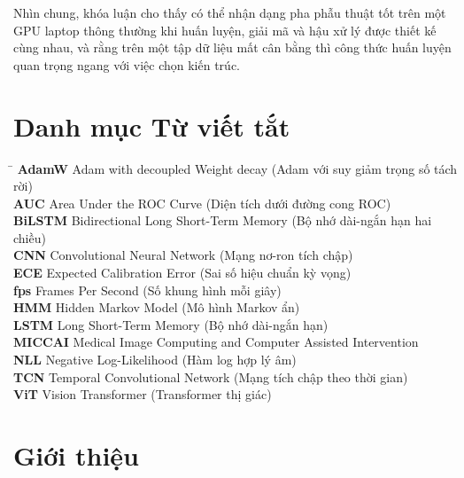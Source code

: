 \documentclass[11pt,a4paper]{report}
\begin{document}
Nhìn chung, khóa luận cho thấy có thể nhận dạng pha phẫu thuật tốt trên một GPU laptop thông thường khi huấn luyện, giải mã và hậu xử lý được thiết kế cùng nhau, và rằng trên một tập dữ liệu mất cân bằng thì công thức huấn luyện quan trọng ngang với việc chọn kiến trúc.

\tableofcontents
\listoffigures
\listoftables

\chapter*{Danh mục Từ viết tắt}

\begin{tabbing}
\hspace*{3cm}\=\kill
\textbf{AdamW} \> Adam with decoupled Weight decay (Adam với suy giảm trọng số tách rời)\\
\textbf{AUC} \> Area Under the ROC Curve (Diện tích dưới đường cong ROC)\\
\textbf{BiLSTM} \> Bidirectional Long Short-Term Memory (Bộ nhớ dài-ngắn hạn hai chiều)\\
\textbf{CNN} \> Convolutional Neural Network (Mạng nơ-ron tích chập)\\
\textbf{ECE} \> Expected Calibration Error (Sai số hiệu chuẩn kỳ vọng)\\
\textbf{fps} \> Frames Per Second (Số khung hình mỗi giây)\\
\textbf{HMM} \> Hidden Markov Model (Mô hình Markov ẩn)\\
\textbf{LSTM} \> Long Short-Term Memory (Bộ nhớ dài-ngắn hạn)\\
\textbf{MICCAI} \> Medical Image Computing and Computer Assisted Intervention\\
\textbf{NLL} \> Negative Log-Likelihood (Hàm log hợp lý âm)\\
\textbf{TCN} \> Temporal Convolutional Network (Mạng tích chập theo thời gian)\\
\textbf{ViT} \> Vision Transformer (Transformer thị giác)\\
\end{tabbing}

\chapter{Giới thiệu}
\end{document}
